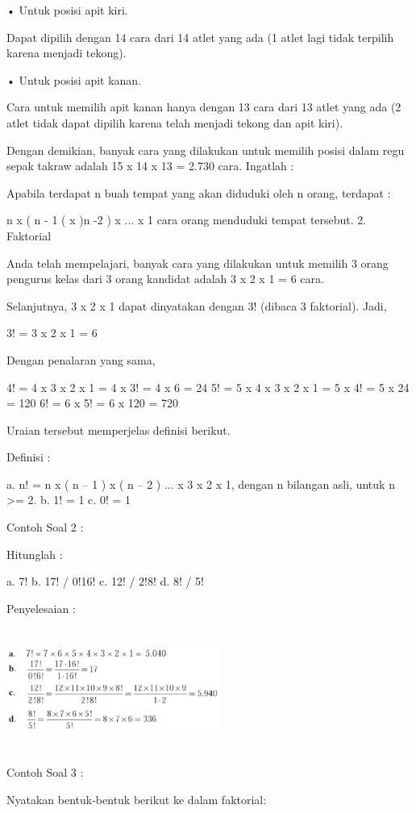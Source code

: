 \documentclass[11pt,fleqn]{book} %
\begin{document}
• Untuk posisi apit kiri.

Dapat dipilih dengan 14 cara dari 14 atlet yang ada (1 atlet lagi tidak terpilih karena menjadi tekong).

• Untuk posisi apit kanan.

Cara untuk memilih apit kanan hanya dengan 13 cara dari 13 atlet yang ada (2 atlet tidak dapat dipilih karena telah menjadi tekong dan apit kiri).

Dengan demikian, banyak cara yang dilakukan untuk memilih posisi dalam regu sepak takraw adalah  15 x 14 x 13 = 2.730 cara.
Ingatlah :

Apabila terdapat n buah tempat yang akan diduduki oleh n orang, terdapat :

n x ( n - 1 ( x )n -2 ) x ... x 1 cara orang menduduki tempat tersebut.
2. Faktorial

Anda telah mempelajari, banyak cara yang dilakukan untuk memilih 3 orang pengurus kelas dari 3 orang kandidat adalah 3 x 2 x 1 = 6 cara.

Selanjutnya, 3 x 2 x 1 dapat dinyatakan dengan 3! (dibaca 3 faktorial). Jadi,

3! = 3 x 2 x 1 = 6

Dengan penalaran yang sama,

4! = 4 x 3 x 2 x 1 = 4 x 3! = 4 x 6 = 24
5! = 5 x 4 x 3 x 2 x 1 = 5 x 4! = 5 x 24 = 120
6! = 6 x 5! = 6 x 120 = 720

Uraian tersebut memperjelas definisi berikut.

Definisi :

a. n! = n x ( n – 1 ) x ( n – 2 ) ... x 3 x 2 x 1, dengan n bilangan asli, untuk n >=  2.
b. 1! = 1
c. 0! = 1

Contoh Soal 2 :

Hitunglah :

a. 7!
b. 17! / 0!16!
c. 12! / 2!8!
d. 8! / 5!

Penyelesaian :


\includegraphics[width = 7cm, height= 4cm]{Pictures/gen3.png}

Contoh Soal 3 :

Nyatakan bentuk-bentuk berikut ke dalam faktorial:
\end{document}
